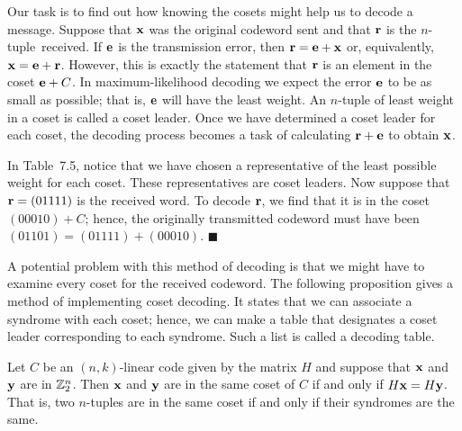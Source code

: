  
\vspace{2ex}
 
 
Our task is to find out how knowing the cosets might help us to 
decode a
message. Suppose that ${\bold x}$ was the original codeword sent and
that ${\bold r}$ is the \mbox{$n$-tuple received}. If ${\bold e}$ is the
transmission error, then ${\bold r} = {\bold e} + {\bold x}$ or,
equivalently, ${\bold x} = {\bold e} + {\bold r}$. However, this is
exactly the statement that ${\bold r}$ is an element in the coset 
${\bold e} + C$. In maximum-likelihood decoding we expect the error
${\bold e}$ to be as small as possible; that is, ${\bold e}$ will have
the least weight. An $n$-tuple of least weight in a coset is called a
{\bfi coset leader}. Once we have determined a
coset leader for each coset, the decoding process becomes a task
of calculating ${\bold r} + {\bold e}$ to obtain ${\bold x}$.
 
 
\vspace{2ex}
 
 
In Table~7.5, notice that we have chosen a representative of the least
possible weight for each coset.  These representatives are coset
leaders. Now suppose that ${\bold r} = (01111)$ is the received word.
To decode ${\bold r}$, we find that it is in the coset $(00010) + C$;
hence, the originally transmitted codeword must have been $(01101) =
(01111) + (00010)$. 
\hspace{\fill} $\blacksquare$
 
 
\vspace{2ex}
 
 
A potential problem with this method of decoding is that we might have
to examine every coset for the received codeword. The following
proposition gives a method of implementing coset decoding. It states
that we can associate a syndrome with each coset; hence, we can make a
table that designates a coset leader corresponding to each syndrome. Such
a list is called a {\bfi decoding table}.
 
 
\begin{proposition}
Let $C$ be an $(n,k)$-linear code given by the matrix $H$ and suppose
that ${\bold x}$ and ${\bold y}$ are in ${\Bbb Z}_2^n$. Then ${\bold
x}$ and ${\bold y}$ are in the same coset of $C$ if and only if
$H{\bold x} = H{\bold y}$. That is, two $n$-tuples are in the same
coset if and only if their syndromes are the same.
\end{proposition}
 
